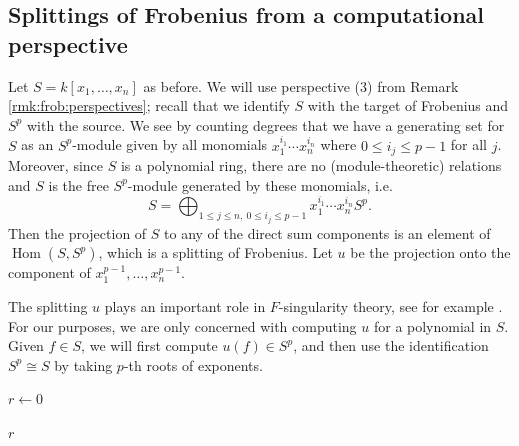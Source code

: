 \documentclass[a4paper]{article}
\theoremstyle{definition}
\theoremstyle{remark}
\newcommand{\isom}{\cong}
\newcommand{\Hom}{\operatorname{Hom}}
\begin{document}
\subsection{Splittings of Frobenius from a computational perspective}

Let \(S = k[x_{1}, \ldots, x_{n}]\) as before. 
We will use perspective (3) from
Remark \ref{rmk:frob:perspectives}; 
recall that we identify 
\(S\) with the target of Frobenius and
\(S^{p}\) with the source.
We see 
by counting degrees
that we have a generating set for \(S\) as an
\(S^{p}\)-module given by
all monomials
\(x_{1}^{i_{1}}\cdots x_{n}^{i_{n}}\)
where \(0 \leq i_{j} \leq p-1\) for all \(j\).
Moreover, since \(S\) is a polynomial ring, 
there are no (module-theoretic) relations
and
\(S\) is the free \(S^{p}\)-module generated by 
these monomials, i.e.  \[
S = \bigoplus_{1 \leq j \leq n,~ 0 \leq i_{j} \leq p-1}^{} x_{1}^{i_{1}}\cdots x_{n}^{i_{n}} S^{p}
.\] 
Then the projection of \(S\) to any of the direct sum components
is an element of \(\Hom(S,S^{p})\), which is a
splitting of Frobenius.
Let \(u\) be the projection onto the component of
\(x_{1}^{p-1}, \ldots, x_{n}^{p-1}\).

The splitting \(u\) plays an important role in \(F\)-singularity
theory, see for example 
\cite[Claim~2.6]{ma-polstra-2021-F-sing-comm-alg}.
For our purposes, we are only concerned with computing \(u\) 
for a polynomial in \(S\). 
Given \(f \in S\), we will first compute
\(u(f) \in S^{p}\), and then use the identification
\(S^{p} \isom S\) by taking \(p\)-th roots of 
exponents.


\begin{algorithm}[H]
\caption{Splitting of Frobenius}
\label{alg:naive:u}
$r \gets 0$\;


\Return $r$
\end{algorithm}
\end{document}
